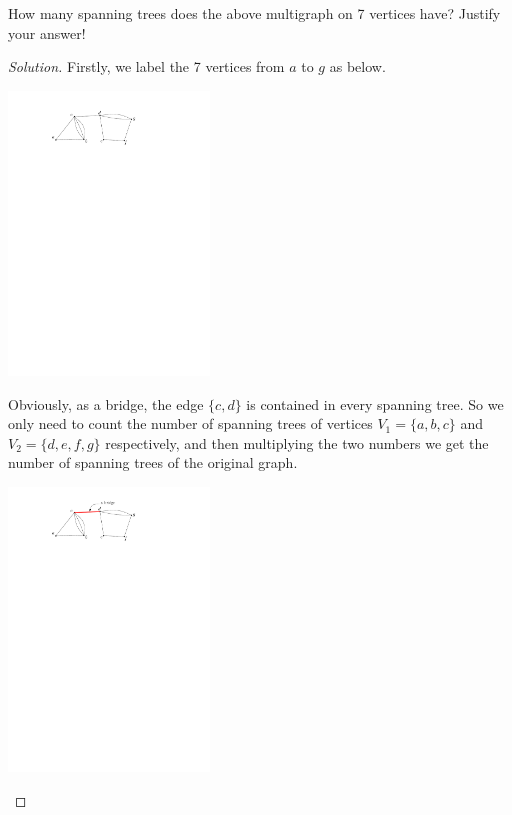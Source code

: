     \begin{thm}{}{}
        How many spanning trees does the above multigraph on 7 vertices have? Justify your answer!
    \end{thm}
    
    \begin{proof}[Solution]
        Firstly, we label the 7 vertices from $a$ to $g$ as below.
        \begin{center}
            \includegraphics[width=0.4\textwidth]{T4/figures/multigraph-labeled.pdf}
        \end{center}
        
        Obviously, as a bridge, the edge $\{c, d\}$ is contained in every spanning tree. So we only need to count the number of spanning trees of vertices $V_1 = \{a, b, c\}$ and $V_2 = \{d, e , f, g\}$ respectively, and then multiplying the two numbers we get the number of spanning trees of the original graph.
        \begin{center}
            \includegraphics[width=0.4\textwidth]{T4/figures/multigraph-bridge.pdf}
        \end{center}
        

\end{proof}
